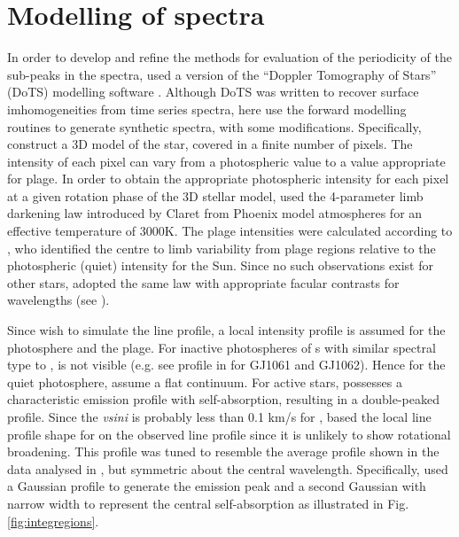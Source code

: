 \chapter{Modelling of {\prox} spectra}
\protect\label{chapter:modelling}

In order to develop and refine the methods for evaluation of the periodicity of the sub-peaks in the {\prox} spectra,
{\Firstp} used a version of the ``Doppler Tomography of Stars'' (DoTS) modelling software
\citep{CCamerondotsa}. Although DoTS was written to recover surface imhomogeneities from time series spectra, here
{\Firstp} use the forward modelling routines to generate synthetic spectra, with some modifications. Specifically,
{\Firstp} construct a 3D model of the star, covered in a finite number of pixels. The intensity of each pixel can vary
from a photospheric value to a value appropriate for plage. In order to obtain the appropriate photospheric intensity
for each pixel at a given rotation phase of the 3D stellar model, {\Firstp} used the 4-parameter limb darkening law
introduced by Claret from Phoenix model atmospheres \citep{claret00a} for an effective temperature of 3000K. The plage
intensities were calculated according to \citet[Section 4.1]{unruh99}, who identified the centre to limb variability
from plage regions relative to the photospheric (quiet) intensity for the Sun. Since no such observations exist for
other stars, {\Firstp} adopted the same law with appropriate facular contrasts for {\ha} wavelengths (see \citet[figs 3
\& 4]{unruh99}).

Since {\Firstp} wish to simulate the {\ha} line profile, a local intensity profile is assumed for the photosphere and
the plage. For inactive photospheres of \rdwarf s with similar spectral type to {\prox}, {\ha} is not visible (e.g. see
{\ha} profile in \citet[fig. 6]{barnes14} for GJ1061 and GJ1062). Hence for the quiet photosphere, {\Firstp} assume a
flat continuum. For active stars, {\ha} possesses a characteristic emission profile with self-absorption, resulting in
a double-peaked profile. Since the \textit{vsini} is probably less than 0.1 km/s for \prox, {\Firstp} based the local
line profile shape for {\ha} on the observed {\prox} line profile since it is unlikely to show rotational
broadening. This profile was tuned to resemble the average {\ha} profile shown in the {\uves} data analysed in
\citet{fuhrmeister11}, but symmetric about the central wavelength. Specifically, {\Firstp} used a Gaussian profile to
generate the emission peak and a second Gaussian with narrow width to represent the central self-absorption as
illustrated in Fig. \ref{fig:integregions}.


